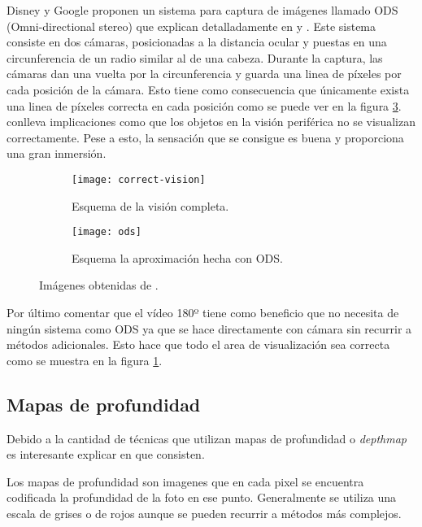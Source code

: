 Disney y Google proponen un sistema para captura de imágenes llamado ODS (Omni-directional stereo) que explican detalladamente en \cite{GoogleStereoscopy} y \cite{DisneyOmnistereoscopic}. Este sistema consiste en dos cámaras, posicionadas a la distancia ocular y puestas en una circunferencia de un radio similar al de una cabeza. Durante la captura, las cámaras dan una vuelta por la circunferencia y guarda una linea de píxeles por cada posición de la cámara. Esto tiene como consecuencia que únicamente exista una linea de píxeles correcta en cada posición como se puede ver en la figura \ref{fig:ods-schema}.  conlleva implicaciones como que los objetos en la visión periférica no se visualizan correctamente. Pese a esto, la sensación que se consigue es buena y proporciona una gran inmersión.

\begin{figure}[h]
\centering
\begin{subfigure}{.47\linewidth}
	\centering
  \texttt{[image: correct-vision]}
  \caption{Esquema de la visión completa.}
  \label{fig:correct-vision-schema}
\end{subfigure}%
\hspace{.05\linewidth}
\begin{subfigure}{.47\linewidth}
	\centering
  \texttt{[image: ods]}
  \caption{Esquema la aproximación hecha con ODS.}
  \label{fig:ods-schema}
\end{subfigure}
\caption{Imágenes obtenidas de \cite{GoogleStereoscopy}.}
\end{figure}

Por último comentar que el vídeo 180º tiene como beneficio que no necesita de ningún sistema como ODS ya que se hace directamente con cámara sin recurrir a métodos adicionales. Esto hace que todo el area de visualización sea correcta como se muestra en la figura \ref{fig:correct-vision-schema}.

\subsection{Mapas de profundidad}
Debido a la cantidad de técnicas que utilizan mapas de profundidad o \textit{depthmap} es interesante explicar en que consisten. 

Los mapas de profundidad son imagenes que en cada pixel se encuentra codificada la profundidad de la foto en ese punto. Generalmente se utiliza una escala de grises o de rojos aunque se pueden recurrir a métodos más complejos.\cite{Josh6DoFUnity}

